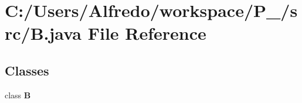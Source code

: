 \section{C\+:/\+Users/\+Alfredo/workspace/\+P\+\_/src/B.java File Reference}
\label{_b_8java}
\subsection*{Classes}
\begin{DoxyCompactItemize}
\item 
class {\bf B}
\end{DoxyCompactItemize}
